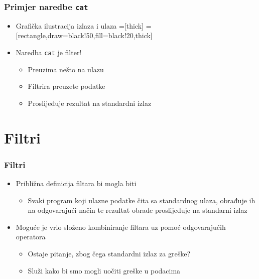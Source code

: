 \documentclass{beamer}
\newcommand{\shell}[1]{\texttt{#1}}
\begin{document}
\begin{frame}[t]
\frametitle{Primjer naredbe \shell{cat}}
\begin{itemize}
  \item Grafička ilustracija izlaza i ulaza
  \vspace{1cm}
  =[thick]
  =[rectangle,draw=black!50,fill=black!20,thick]
  \vspace{1cm}
  \item Naredba \shell{cat} je filter!
  \begin{itemize}
    \item Preuzima nešto na ulazu
    \item Filtrira preuzete podatke
    \item Proslijeđuje rezultat na standardni izlaz
  \end{itemize}
\end{itemize}
\end{frame}

\section{Filtri}
\begin{frame}[t]
\frametitle{Filtri}
\begin{itemize}
  \item Približna definicija filtara bi mogla biti
  \begin{itemize}
    \footnotesize
    \item[] Svaki program koji ulazne podatke čita sa standardnog ulaza,
            obrađuje ih na odgovarajući način te rezultat obrade
            proslijeđuje na standarni izlaz
    \normalsize
  \end{itemize}
  \item Moguće je vrlo složeno kombiniranje filtara uz pomoć odgovarajućih
        operatora
  \begin{itemize}
    \item Ostaje pitanje, zbog čega standardni izlaz za greške?
    \item Služi kako bi smo mogli uočiti greške u podacima
  \end{itemize}
\end{itemize}
\end{frame}
\end{document}
